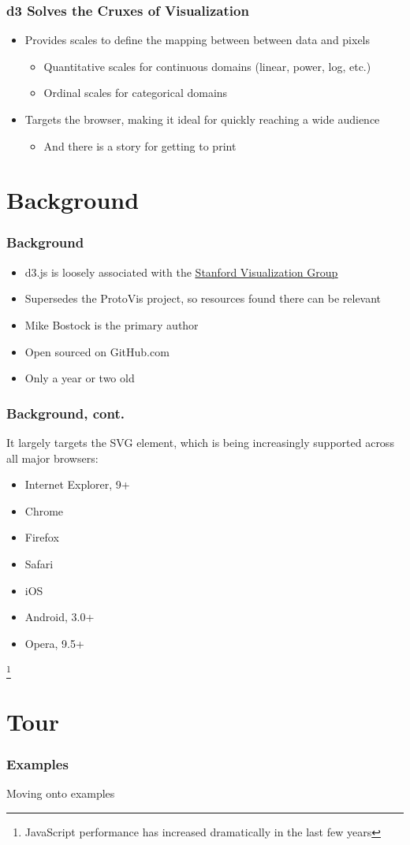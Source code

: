 \documentclass{beamer}
\begin{document}
\begin{frame}
\frametitle{d3 Solves the Cruxes of Visualization}
\begin{itemize}
\pause
\item Provides scales to define the mapping between between data and pixels
\pause
    \begin{itemize}
    \item Quantitative scales for continuous domains (linear, power, log, etc.)
\pause
    \item Ordinal scales for categorical domains
    \end{itemize}
\pause
\item Targets the browser, making it ideal for quickly reaching a wide audience
    \begin{itemize}
\pause
    \item And there is a story for getting to print
    \end{itemize}
\end{itemize}
\end{frame}



\section{Background}



\begin{frame}
\frametitle{Background}
\begin{itemize}
\item d3.js is loosely associated with the \href{http://vis.stanford.edu/}{\underline{Stanford Visualization Group}}
\pause
\item Supersedes the ProtoVis project, so resources found there can be relevant
\pause
\item Mike Bostock is the primary author
\pause
\item Open sourced on GitHub.com
\pause
\item Only a year or two old
\end{itemize}
\end{frame}



\begin{frame}
\frametitle{Background, cont.}
It largely targets the SVG element, which is being increasingly supported across all major browsers:
\pause
    \begin{itemize}
    \item Internet Explorer, 9+
    \item Chrome
    \item Firefox
    \item Safari
    \item iOS
    \item Android, 3.0+
    \item Opera, 9.5+
    \end{itemize}
\pause
\footnote{JavaScript performance has increased dramatically in the last few years}
\end{frame}



\section{Tour}


\begin{frame}
\frametitle{Examples}
Moving onto examples
\end{frame}
\end{document}

